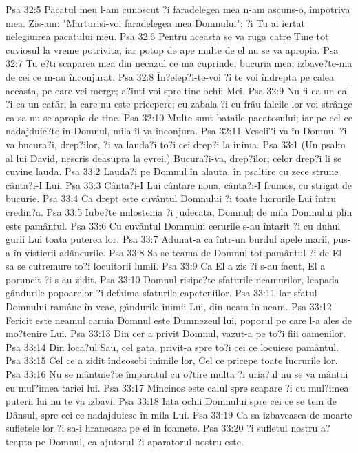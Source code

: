 Psa 32:5  Pacatul meu l-am cunoscut ?i faradelegea mea n-am ascuns-o, împotriva mea. Zis-am: "Marturisi-voi faradelegea mea Domnului"; ?i Tu ai iertat nelegiuirea pacatului meu.
Psa 32:6  Pentru aceasta se va ruga catre Tine tot cuviosul la vreme potrivita, iar potop de ape multe de el nu se va apropia.
Psa 32:7  Tu e?ti scaparea mea din necazul ce ma cuprinde, bucuria mea; izbave?te-ma de cei ce m-au înconjurat.
Psa 32:8  În?elep?i-te-voi ?i te voi îndrepta pe calea aceasta, pe care vei merge; a?inti-voi spre tine ochii Mei.
Psa 32:9  Nu fi ca un cal ?i ca un catâr, la care nu este pricepere; cu zabala ?i cu frâu falcile lor voi strânge ca sa nu se apropie de tine.
Psa 32:10  Multe sunt bataile pacatosului; iar pe cel ce nadajduie?te în Domnul, mila îl va înconjura.
Psa 32:11  Veseli?i-va în Domnul ?i va bucura?i, drep?ilor, ?i va lauda?i to?i cei drep?i la inima.
Psa 33:1  (Un psalm al lui David, nescris deasupra la evrei.) Bucura?i-va, drep?ilor; celor drep?i li se cuvine lauda.
Psa 33:2  Lauda?i pe Domnul în alauta, în psaltire cu zece strune cânta?i-I Lui.
Psa 33:3  Cânta?i-I Lui cântare noua, cânta?i-I frumos, cu strigat de bucurie.
Psa 33:4  Ca drept este cuvântul Domnului ?i toate lucrurile Lui întru credin?a.
Psa 33:5  Iube?te milostenia ?i judecata, Domnul; de mila Domnului plin este pamântul.
Psa 33:6  Cu cuvântul Domnului cerurile s-au întarit ?i cu duhul gurii Lui toata puterea lor.
Psa 33:7  Adunat-a ca într-un burduf apele marii, pus-a în vistierii adâncurile.
Psa 33:8  Sa se teama de Domnul tot pamântul ?i de El sa se cutremure to?i locuitorii lumii.
Psa 33:9  Ca El a zis ?i s-au facut, El a poruncit ?i s-au zidit.
Psa 33:10  Domnul risipe?te sfaturile neamurilor, leapada gândurile popoarelor ?i defaima sfaturile capeteniilor.
Psa 33:11  Iar sfatul Domnului ramâne în veac, gândurile inimii Lui, din neam în neam.
Psa 33:12  Fericit este neamul caruia Domnul este Dumnezeul lui, poporul pe care l-a ales de mo?tenire Lui.
Psa 33:13  Din cer a privit Domnul, vazut-a pe to?i fiii oamenilor.
Psa 33:14  Din loca?ul Sau, cel gata, privit-a spre to?i cei ce locuiesc pamântul.
Psa 33:15  Cel ce a zidit îndeosebi inimile lor, Cel ce pricepe toate lucrurile lor.
Psa 33:16  Nu se mântuie?te împaratul cu o?tire multa ?i uria?ul nu se va mântui cu mul?imea tariei lui.
Psa 33:17  Mincinos este calul spre scapare ?i cu mul?imea puterii lui nu te va izbavi.
Psa 33:18  Iata ochii Domnului spre cei ce se tem de Dânsul, spre cei ce nadajduiesc în mila Lui.
Psa 33:19  Ca sa izbaveasca de moarte sufletele lor ?i sa-i hraneasca pe ei în foamete.
Psa 33:20  ?i sufletul nostru a?teapta pe Domnul, ca ajutorul ?i aparatorul nostru este.
